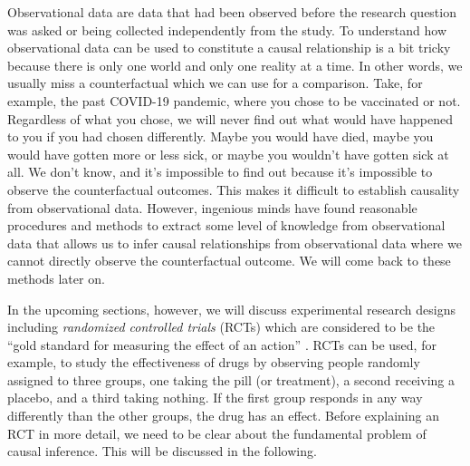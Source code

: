 \documentclass[
  12pt,
  oneside]{book}
\theoremstyle{definition}
\theoremstyle{definition}
\theoremstyle{definition}
\theoremstyle{definition}
\theoremstyle{remark}
\begin{document}
Observational data are data that had been observed before the research question was asked or being collected independently from the study.
To understand how observational data can be used to constitute a causal relationship is a bit tricky because there is only one world and only one reality at a time. In other words, we usually miss a counterfactual which we can use for a comparison. Take, for example, the past COVID-19 pandemic, where you chose to be vaccinated or not. Regardless of what you chose, we will never find out what would have happened to you if you had chosen differently. Maybe you would have died, maybe you would have gotten more or less sick, or maybe you wouldn't have gotten sick at all. We don't know, and it's impossible to find out because it's impossible to observe the counterfactual outcomes. This makes it difficult to establish causality from observational data. However, ingenious minds have found reasonable procedures and methods to extract some level of knowledge from observational data that allows us to infer causal relationships from observational data where we cannot directly observe the counterfactual outcome. We will come back to these methods later on.

In the upcoming sections, however, we will discuss experimental research designs including \emph{randomized controlled trials} (RCTs) which are considered to be the ``gold standard for measuring the effect of an action'' \citep[p.~128]{Taddy2019Business}. RCTs can be used, for example, to study the effectiveness of drugs by observing people randomly assigned to three groups, one taking the pill (or treatment), a second receiving a placebo, and a third taking nothing. If the first group responds in any way differently than the other groups, the drug has an effect. Before explaining an RCT in more detail, we need to be clear about the fundamental problem of causal inference. This will be discussed in the following.
\end{document}
